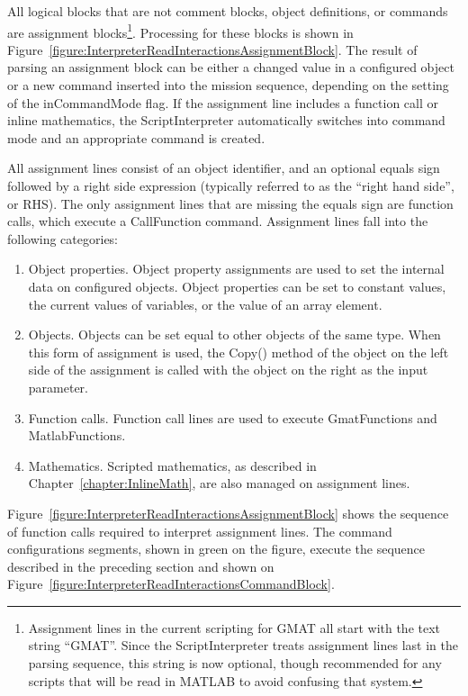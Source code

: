 All logical blocks that are not comment blocks, object definitions, or commands are assignment
blocks\footnote{Assignment lines in the current scripting for GMAT all start with the text string
``GMAT''.  Since the ScriptInterpreter treats assignment lines last in the parsing sequence, this
string is now optional, though recommended for any scripts that will be read in MATLAB to avoid
confusing that system.}.  Processing for these blocks is shown in
Figure~\ref{figure:InterpreterReadInteractionsAssignmentBlock}.  The result of parsing an assignment
block can be either a changed value in a configured object or a new command inserted into the
mission sequence, depending on the setting of the inCommandMode flag.  If the assignment line
includes a function call or inline mathematics, the ScriptInterpreter automatically switches into
command mode and an appropriate command is created.

All assignment lines consist of an object identifier, and an optional equals sign followed by a
right side expression (typically referred to as the ``right hand side'', or RHS).  The only
assignment lines that are missing the equals sign are function calls, which execute a CallFunction
command. Assignment lines fall into the following categories:

\begin{enumerate}
\item Object properties.  Object property assignments are used to set the internal data on
configured objects.  Object properties can be set to constant values, the current values of
variables, or the value of an array element.
\item Objects.  Objects can be set equal to other objects of the same type.  When this form of
assignment is used, the Copy() method of the object on the left side of the assignment is called
with the object on the right as the input parameter.
\item Function calls.  Function call lines are used to execute GmatFunctions and MatlabFunctions.
\item Mathematics.  Scripted mathematics, as described in Chapter~\ref{chapter:InlineMath}, are also
managed on assignment lines.
\end{enumerate}

Figure~\ref{figure:InterpreterReadInteractionsAssignmentBlock} shows the sequence of function calls
required to interpret assignment lines.  The command configurations segments, shown in green on the
figure, execute the sequence described in the preceding section and shown on
Figure~\ref{figure:InterpreterReadInteractionsCommandBlock}.

